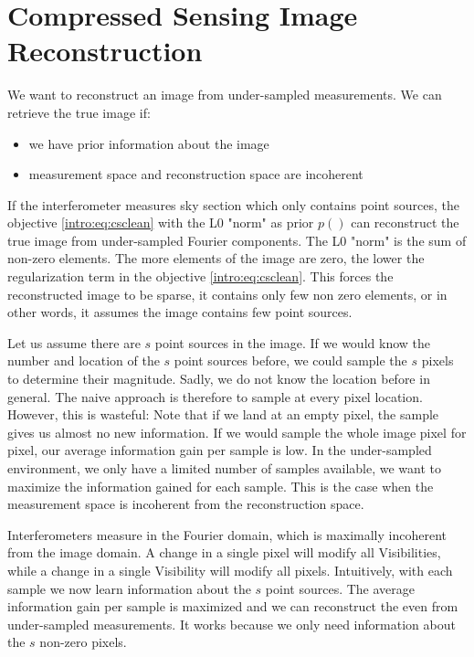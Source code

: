 \section{Compressed Sensing Image Reconstruction} \label{cs}
We want to reconstruct an image from under-sampled measurements. We can retrieve the true image if:

\begin{itemize}
	\item we have prior information about the image
	\item measurement space and reconstruction space are incoherent
\end{itemize}

If the interferometer measures sky section which only contains point sources, the objective \eqref{intro:eq:csclean} with the L0 "norm" as prior $p()$ can reconstruct the true image from under-sampled Fourier components. The L0 "norm" is the sum of non-zero elements. The more elements of the image are zero, the lower the regularization term in the objective \eqref{intro:eq:csclean}. This forces the reconstructed image to be sparse, it contains only few non zero elements, or in other words, it assumes the image contains few point sources. 

Let us assume there are $s$ point sources in the image. If we would know the number and location of the $s$ point sources before, we could sample the $s$ pixels to determine their magnitude. Sadly, we do not know the location before in general. The naive approach is therefore to sample at every pixel location. However, this is wasteful: Note that if we land at an empty pixel, the sample gives us almost no new information. If we would sample the whole image pixel for pixel, our average information gain per sample is low. In the under-sampled environment, we only have a limited number of samples available, we want to maximize the information gained for each sample. This is the case when the measurement space is incoherent from the reconstruction space.

Interferometers measure in the Fourier domain, which is maximally incoherent from the image domain. A change in a single pixel will modify all Visibilities, while a change in a single Visibility will modify all pixels. Intuitively, with each sample we now learn information about the $s$ point sources. The average information gain per sample is maximized and we can reconstruct the even from under-sampled measurements. It works because we only need information about the $s$ non-zero pixels.

